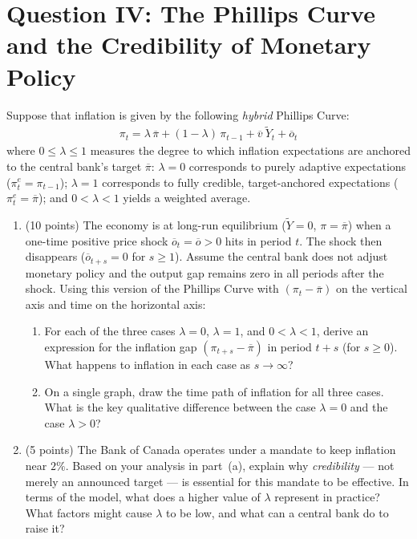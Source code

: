 \documentclass[letterpaper,12pt]{article}
\theoremstyle{dotlessS}
\begin{document}
\section*{Question IV: The Phillips Curve and the Credibility of Monetary Policy}
Suppose that inflation is given by the following \emph{hybrid} Phillips Curve:
\begin{eqnarray*}
\pi_t = \lambda\,\overline{\pi} + (1-\lambda)\,\pi_{t-1} + \overline{v}\:\widetilde{Y}_t + \overline{o}_t
\end{eqnarray*}
where $0 \leq \lambda \leq 1$ measures the degree to which inflation expectations are anchored to the central bank's target $\overline{\pi}$: $\lambda = 0$ corresponds to purely adaptive expectations ($\pi^e_t = \pi_{t-1}$); $\lambda = 1$ corresponds to fully credible, target-anchored expectations ($\pi^e_t = \overline{\pi}$); and $0 < \lambda < 1$ yields a weighted average.
\begin{enumerate}[label=(\alph*)]
\item (10 points) The economy is at long-run equilibrium ($\widetilde{Y} = 0$, $\pi = \overline{\pi}$) when a one-time positive price shock $\overline{o}_t = \overline{o} > 0$ hits in period $t$. The shock then disappears ($\overline{o}_{t+s} = 0$ for $s \geq 1$). Assume the central bank does not adjust monetary policy and the output gap remains zero in all periods after the shock. Using this version of the Phillips Curve with $(\pi_t - \overline{\pi})$ on the vertical axis and time on the horizontal axis:
\begin{enumerate}[label=\roman*.]
    \item For each of the three cases $\lambda = 0$, $\lambda = 1$, and $0 < \lambda < 1$, derive an expression for the inflation gap $(\pi_{t+s} - \overline{\pi})$ in period $t+s$ (for $s \geq 0$). What happens to inflation in each case as $s \to \infty$?
    \item On a single graph, draw the time path of inflation for all three cases. What is the key qualitative difference between the case $\lambda = 0$ and the case $\lambda > 0$?
\end{enumerate}
\item (5 points) The Bank of Canada operates under a mandate to keep inflation near $2\%$. Based on your analysis in part~(a), explain why \emph{credibility} — not merely an announced target — is essential for this mandate to be effective. In terms of the model, what does a higher value of $\lambda$ represent in practice? What factors might cause $\lambda$ to be low, and what can a central bank do to raise it?
\end{enumerate}
\end{document}
